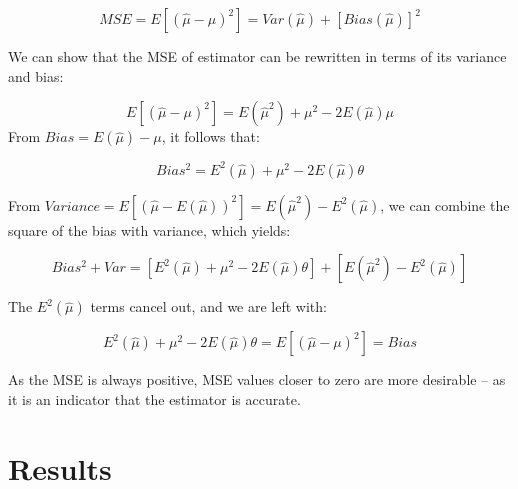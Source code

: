 \documentclass[12pt, twoside]{amherstthesis}
\begin{document}
\[MSE = E[(\hat{\mu} -\mu)^2] = Var(\hat{\mu})+[Bias(\hat{\mu})]^2\]

We can show that the MSE of estimator can be rewritten in terms of its variance and bias:

\[E[(\hat{\mu} -\mu)^2] = E(\hat{\mu}^2) + \mu^2 - 2E(\hat{\mu})\mu\]
From \(Bias = E(\hat{\mu}) - \mu\), it follows that:

\[Bias^2 = E^2(\hat{\mu}) +\mu^2 -2E(\hat{\mu})\theta\]

From \(Variance = E[(\hat{\mu}-E(\hat{\mu}))^2] = E(\hat{\mu}^2) - E^2(\hat{\mu})\), we can combine the square of the bias with variance, which yields:

\[Bias^2 + Var = [E^2(\hat{\mu}) +\mu^2 -2E(\hat{\mu})\theta] + [E(\hat{\mu}^2) - E^2(\hat{\mu})]\]

The \(E^2(\hat{\mu})\) terms cancel out, and we are left with:

\[E^2(\hat{\mu}) +\mu^2 -2E(\hat{\mu})\theta = E[(\hat{\mu} -\mu)^2] = Bias\]

As the MSE is always positive, MSE values closer to zero are more desirable -- as it is an indicator that the estimator is accurate.

\hypertarget{results}{%
\section{Results}\label{results}}
\end{document}
